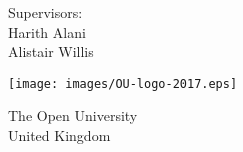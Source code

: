 \begin{titlepage}
    \begin{center}
        \vspace*{1cm}
            
        \Huge
        \textbf{\thetitle}
            
        \vspace{0.5cm}
        \LARGE
        \makeatletter \@subtitle \makeatother %
            
        \vspace{1.5cm}
            
        \textbf{\theauthor}
            
        \vfill
            
        Supervisors:\\
        Harith Alani\\
        Alistair Willis
            
        \vspace{0.8cm}
            
        \texttt{[image: images/OU-logo-2017.eps]}
        \vspace{1.6cm}
        
        \centering
        \usebox{\largestimage}
        \hfill
        
        \vspace{0.8cm}
            
        \Large
        The Open University\\
        United Kingdom\\
        \thedate
            
    \end{center}
\end{titlepage}